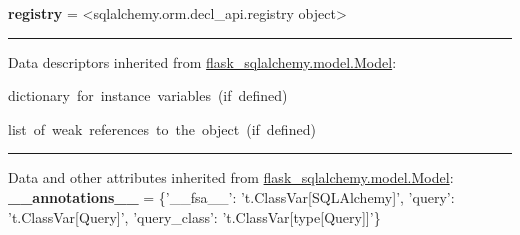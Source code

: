 \begin{longtable}[]
\begin{minipage}[t]{\linewidth}
\begin{longtable}[]
\begin{minipage}[t]{\linewidth}
\textbf{registry} = \textless sqlalchemy.orm.decl\_api.registry
object\textgreater{}

\begin{center}\rule{0.5\linewidth}{0.5pt}\end{center}

Data descriptors inherited from
\href{flask_sqlalchemy.model.html\#Model}{flask\_sqlalchemy.model.Model}:\\

\begin{description}
\tightlist
\item[\textbf{\_\_dict\_\_}]
{dictionary~for~instance~variables~(if~defined)}
\end{description}

\begin{description}
\tightlist
\item[\textbf{\_\_weakref\_\_}]
{list~of~weak~references~to~the~object~(if~defined)}
\end{description}

\begin{center}\rule{0.5\linewidth}{0.5pt}\end{center}

Data and other attributes inherited from
\href{flask_sqlalchemy.model.html\#Model}{flask\_sqlalchemy.model.Model}:\\

\textbf{\_\_annotations\_\_} = \{'\_\_fsa\_\_':
't.ClassVar{[}SQLAlchemy{]}', 'query': 't.ClassVar{[}Query{]}',
'query\_class': 't.ClassVar{[}type{[}Query{]}{]}'\}\strut
\end{minipage} \\
\bottomrule
\end{longtable}


\end{minipage}
\end{longtable}
